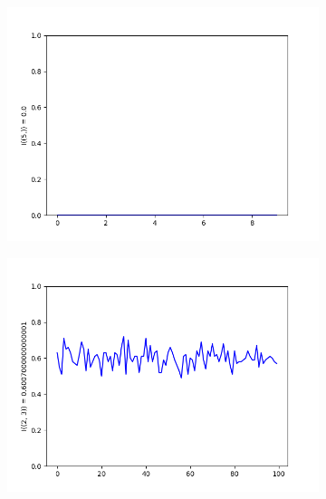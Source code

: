 \documentclass{llncs}
\begin{document}
\begin{figure}
\begin{subfigure}{0.5\linewidth}
\centering\includegraphics[scale=0.4]{images/1-consistent-partition.png}\hfill
\end{subfigure}
\begin{subfigure}{0.5\linewidth}
\centering\includegraphics[scale=0.4]{images/2-3-consistent-partitions-probability.png}\hfill
\end{subfigure}
\begin{subfigure}{0.5\linewidth}

\end{subfigure}
\end{figure}
\end{document}
